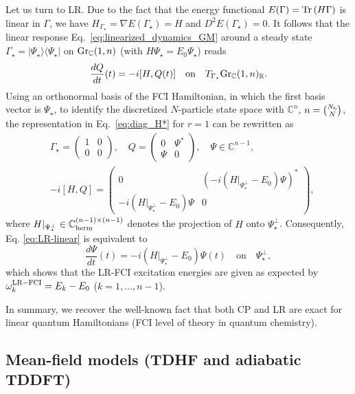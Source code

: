 \documentclass[11pt]{article}
\def\tr{{\rm Tr \,}}
\def\R{{\mathbb R}}
\def\C{{\mathbb C}}
\begin{document}
Let us turn to LR. Due to the fact that the energy functional $E(\Gamma)=\tr(H\Gamma)$ is linear in $\Gamma$, we have $H_{\Gamma_\star}=\nabla E(\Gamma_\star)=H$ and $D^2E(\Gamma_\star)=0$. It follows that the linear response Eq.~\eqref{eq:linearized_dynamics_GM} around a steady state $\Gamma_\star=|\Psi_\star\rangle\langle\Psi_\star|$ on ${\rm Gr}_\C(1,n)$ (with $H\Psi_\star=E_0 \Psi_\star$) reads
\begin{equation} \label{eq:LR-linear}
\frac{dQ}{dt}(t)=-i[H,Q(t)] \quad \mbox{on} \quad T_{\Gamma_\star} {\rm Gr}_\C(1,n)_\R.
\end{equation}
Using an orthonormal basis of the FCI Hamiltonian, in which the first basis vector is $\Psi_\star$, to identify the discretized $N$-particle state space with $\C^n$, $n=\binom{N_{\rm b}}{N}$, the representation in Eq.~\eqref{eq:diag_H*} for $r=1$ can be rewritten as
\begin{align*}
    &\Gamma_\star = \left( \begin{array}{cc} 1 & 0 \\ 0 & 0 \end{array} \right), \quad Q =  \left( \begin{array}{cc} 0 & \Psi^* \\ \Psi & 0 \end{array} \right), \quad \Psi\in\C^{n-1},\\
    & -i[H,Q]=  \left( \begin{array}{cc} 0 & (-i(H|_{\Psi_\star^\perp}-E_0)\Psi)^* \\ -i(H|_{\Psi_\star^\perp}-E_0)\Psi & 0 \end{array} \right) ,
\end{align*}
where $H|_{\Psi_\star^\perp}\in\C_{\rm herm}^{(n-1)\times (n-1)}$ denotes the projection of $H$ onto $\Psi_\star^\perp$. Consequently, Eq. \eqref{eq:LR-linear} is equivalent to
$$
\frac{d\Psi}{dt}(t) = -i(H|_{\Psi_\star^\perp}-E_0)\Psi(t) \quad \mbox{on} \quad \Psi_\star^\perp,
$$
which shows that the LR-FCI excitation energies are given as expected by $\omega^{\rm LR-FCI}_k=E_k-E_0$ ($k=1,\ldots,n-1$). 

In summary, we recover the well-known fact that both CP and LR are exact for linear quantum Hamiltonians (FCI level of theory in quantum chemistry).

\subsection{Mean-field models (TDHF and adiabatic TDDFT)} 
\label{subsec:mean-field_models}
\end{document}
